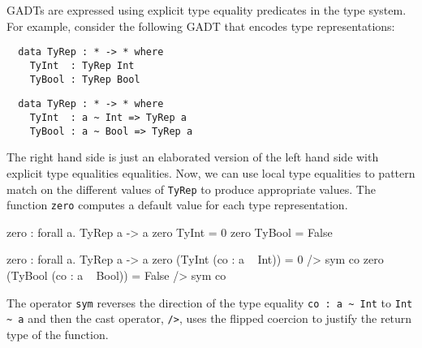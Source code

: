 \documentclass[manuscript,screen,nonacm]{acmart}
\begin{document}
\section{\SFK}\label{sec:sfk} %
GADTs are expressed using explicit type equality predicates in the type system. For example, consider the following GADT that encodes type representations:

\begin{minipage}[ht]{0.5\linewidth}
  \begin{lstlisting}
  data TyRep : * -> * where
    TyInt  : TyRep Int
    TyBool : TyRep Bool
  \end{lstlisting}
\end{minipage}%
\begin{minipage}[ht]{0.5\linewidth}
  \begin{lstlisting}
  data TyRep : * -> * where
    TyInt  : a ~ Int => TyRep a
    TyBool : a ~ Bool => TyRep a
  \end{lstlisting}
\end{minipage}

The right hand side is just an elaborated version of the left hand side with explicit type equalities equalities.
Now, we can use local type equalities to pattern match on the different values of \lstinline{TyRep} to produce appropriate values. The function \lstinline{zero} computes a default value for each type representation.

\begin{minipage}{0.5\linewidth}
  \begin{codef}
    zero : forall a. TyRep a -> a
    zero TyInt = 0
    zero TyBool = False
  \end{codef}
\end{minipage}%
\begin{minipage}{0.5\linewidth}
  \begin{codef}
    zero : forall a. TyRep a -> a
    zero (TyInt (co : a ~ Int))   = 0 /> sym co
    zero (TyBool (co : a ~ Bool)) = False /> sym co
  \end{codef}
\end{minipage}

The operator \lstinline|sym| reverses the direction of the type equality \lstinline|co : a ~ Int| to \lstinline|Int ~ a| and then the cast operator, \lstinline{/>}, uses the flipped coercion to justify the return type of the function.
\end{document}
